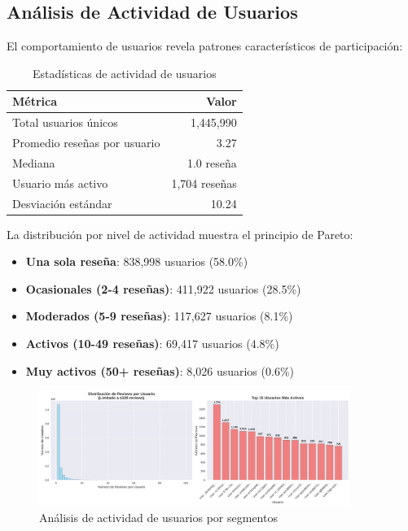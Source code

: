 \documentclass[12pt,a4paper,twoside,openany]{book}
\begin{document}
\subsection{Análisis de Actividad de Usuarios}

El comportamiento de usuarios revela patrones característicos de participación:

\begin{table}[H]
\centering
\caption{Estadísticas de actividad de usuarios}
\begin{tabular}{@{}lr@{}}
\toprule
\textbf{Métrica} & \textbf{Valor} \\
\midrule
Total usuarios únicos & 1,445,990 \\
Promedio reseñas por usuario & 3.27 \\
Mediana & 1.0 reseña \\
Usuario más activo & 1,704 reseñas \\
Desviación estándar & 10.24 \\
\bottomrule
\end{tabular}
\end{table}

La distribución por nivel de actividad muestra el principio de Pareto:
\begin{itemize}
    \item \textbf{Una sola reseña}: 838,998 usuarios (58.0\%)
    \item \textbf{Ocasionales (2-4 reseñas)}: 411,922 usuarios (28.5\%)
    \item \textbf{Moderados (5-9 reseñas)}: 117,627 usuarios (8.1\%)
    \item \textbf{Activos (10-49 reseñas)}: 69,417 usuarios (4.8\%)
    \item \textbf{Muy activos (50+ reseñas)}: 8,026 usuarios (0.6\%)
\end{itemize}

\begin{figure}[H]
\centering
\includegraphics[width=0.9\textwidth]{figures/reviews_user_activity_analysis.png}
\caption{Análisis de actividad de usuarios por segmentos}
\label{fig:reviews_user_activity}
\end{figure}
\end{document}
